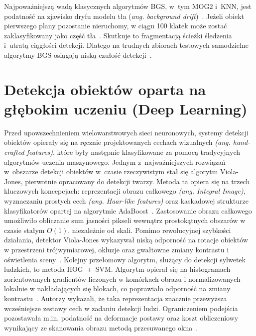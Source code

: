 Najpoważniejszą wadą klasycznych algorytmów BGS, w~tym MOG2 i~KNN, jest podatność na zjawisko dryfu
modelu tła (\textit{ang. background drift})~\cite{waghmare2026}. Jeżeli obiekt pierwszego plany
pozostanie nieruchomy, w ciągu 100 klatek może zostać zaklasyfikowany jako część
tła~\cite{waghmare2026}. Skutkuje to fragmentacją ścieżki śledzenia i~utratą ciągłości detekcji.
Dlatego na trudnych zbiorach testowych samodzielne algorytmy BGS osiągają niską czułość
detekcji~\cite{waghmare2026}.


\section{Detekcja obiektów oparta na głębokim uczeniu (Deep Learning)}

Przed upowszechnieniem wielowarstwowych sieci neuronowych, systemy detekcji obiektów opierały się
na ręcznie projektowanych cechach wizualnych \textit{(ang. hand-crafted features)}, które były
następnie klasyfikowane za pomocą tradycyjnych algorytmów uczenia maszynowego. Jednym
z~najważniejszych rozwiązań w~obszarze detekcji obiektów w~czasie rzeczywistym stał się algorytm
Viola-Jones, pierwotnie opracowany do detekcji twarzy. Metoda ta opiera się na trzech kluczowych
koncepcjach: reprezentacji obrazu całkowego \textit{(ang. Integral Image)}, wyznaczaniu prostych
cech \textit{(ang. Haar-like features)} oraz kaskadowej strukturze klasyfikatorów opartej na
algorytmie AdaBoost~\cite{viola2001}. Zastosowanie obrazu całkowego umożliwiło obliczanie sum
jasności pikseli wewnątrz prostokątnych obszarów w czasie stałym $O(1)$, niezależnie od skali.
Pomimo rewolucyjnej szybkości działania, detektor Viola-Jones wykazywał niską odporność na rotacje
obiektów w przestrzeni trójwymiarowej, okluzje oraz gwałtowne zmiany kontrastu i oświetlenia
sceny~\cite{viola2001}. Kolejny przełomowy algorytm, służący do detekcji sylwetek ludzkich, to
metoda HOG~+~SVM. Algorytm opierał się na histogramach zorientowanych gradientów liczonych w
komórkach obrazu i normalizowanych lokalnie w nakładających się blokach, co poprawiało odporność na
zmiany kontrastu~\cite{dalal2005}. Autorzy wykazali, że taka reprezentacja znacznie przewyższa
wcześniejsze zestawy cech w zadaniu detekcji ludzi. Ograniczeniem podejścia pozostawała m.in.
podatność na deformacje postawy oraz koszt obliczeniowy wynikający ze skanowania obrazu metodą
przesuwanego okna~\cite{dalal2005}.

